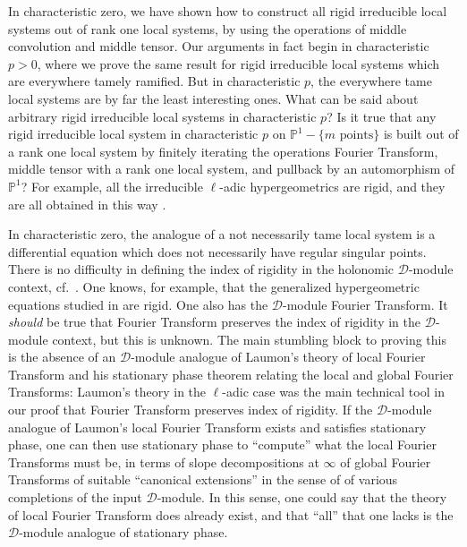 In characteristic zero, we have shown how to construct all rigid
irreducible local systems out of rank one local systems, by using the
operations of middle convolution and middle tensor. Our arguments in fact
begin in characteristic \(p>0\), where we prove the same result for rigid
irreducible local systems which are everywhere tamely ramified. But in
characteristic \(p\), the everywhere tame local systems are by far the
least interesting ones. What can be said about arbitrary rigid irreducible
local systems in characteristic \(p\)? Is it true that any rigid
irreducible local system in characteristic \(p\) on
\(\mathbb{P}^1-\{m\text{ points}\}\) is built out of a rank one local
system by finitely iterating the operations Fourier Transform, middle
tensor with a rank one local system, and pullback by an automorphism of
\(\mathbb{P}^1\)? For example, all the irreducible \(\ell\)-adic
hypergeometrics are rigid, and they are all obtained in this way
\cite[proof of 8.5.3]{Ka-ESDE}.

In characteristic zero, the analogue of a not necessarily tame local
system is a differential equation which does not necessarily have regular
singular points. There is no difficulty in defining the index of rigidity
in the holonomic \(\mathcal{D}\)-module context, cf.\
\cite[3.7.3 and 2.9.8.1]{Ka-ESDE}. One knows, for example, that the
generalized hypergeometric equations studied in \cite{Ka-ESDE} are rigid.
One also has the \(\mathcal{D}\)-module Fourier Transform. It \emph{should}
be true that Fourier Transform preserves the index of rigidity in the
\(\mathcal{D}\)-module context, but this is unknown. The main stumbling
block to proving this is the absence of an \(\mathcal{D}\)-module analogue
of Laumon's theory of local Fourier Transform and his stationary phase
theorem relating the local and global Fourier Transforms: Laumon's theory
in the \(\ell\)-adic case was the main technical tool in our proof that
Fourier Transform preserves index of rigidity. If the
\(\mathcal{D}\)-module analogue of Laumon's local Fourier Transform exists
and satisfies stationary phase, one can then use stationary phase to
``compute'' what the local Fourier Transforms must be, in terms of slope
decompositions at \(\infty\) of global Fourier Transforms of suitable
``canonical extensions'' in the sense of \cite[\S2.4.11]{Ka-DGG} of various
completions of the input \(\mathcal{D}\)-module. In this sense, one could
say that the theory of local Fourier Transform does already exist, and
that ``all'' that one lacks is the \(\mathcal{D}\)-module analogue of
stationary phase.

